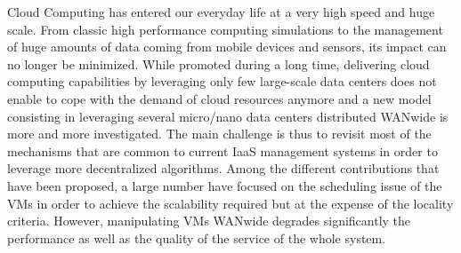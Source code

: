 
Cloud Computing has entered our everyday life at a very high speed and huge scale. From
classic high performance computing simulations to the management of huge amounts of data
coming from mobile devices and sensors, its impact can no longer be minimized.
While promoted during a long time, delivering cloud computing capabilities by leveraging
only few large-scale data centers does not enable to cope with the demand of cloud resources
anymore and a new model consisting in leveraging several micro/nano data centers
distributed WANwide is more and more investigated. The main challenge is thus to revisit
most of the mechanisms that are common to current IaaS management systems in order to
leverage more decentralized algorithms. Among the different contributions that have been
proposed, a large number have focused on the scheduling issue of the VMs in order to
achieve the scalability required but at the expense of the locality criteria. However,
manipulating VMs WANwide degrades significantly the performance as well as the quality of
the service of the whole system.

% 


